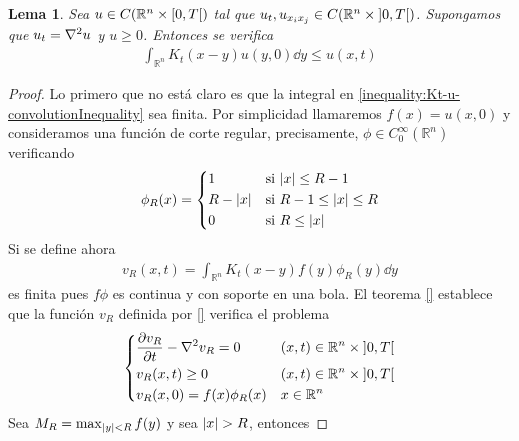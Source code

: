 \documentclass{article}
\newcommand{\realNumbers}{\mathbb{R}}
\newtheorem{lemma}{Lema}
\theoremstyle{definition}
\theoremstyle{remark}
\newcommand{\leftOpenInterval}{\left]}
\newcommand{\rightOpenInterval}{\right[}
\newcommand{\leftClosedInterval}{\left[}
\newcommand{\rightClosedInterval}{\right]}
\newcommand{\interval}[3]{%
  \ifstrequal{#1}{oo}{%
    \leftOpenInterval #2, #3 \rightOpenInterval%
  }{%
    \ifstrequal{#1}{co}{%
      \leftClosedInterval #2, #3 \rightOpenInterval%
    }{%
      \ifstrequal{#1}{oc}{
        \leftOpenInterval #2, #3 \rightClosedInterval%
      }{%
        \ifstrequal{#1}{cc}{
          \leftClosedInterval #2, #3 \rightClosedInterval
        }{%
        }%
      }%
    }%
  }%
}
\begin{document}
  \begin{lemma} %
    Sea \(u \in C(\realNumbers^n \times \interval{co}{0}{T})\) tal que \(u_t, u_{x_i x_j} \in C(\realNumbers^n \times \interval{oo}{0}{T})\).
    Supongamos que \(u_t = \laplacian u\) y \(u \geq 0\).
    Entonces se verifica
    \begin{align}
      \label{inequality:Kt-u-convolutionInequality}
      \int_{\realNumbers^n} K_t(x - y) u(y, 0) \dd y
      \leq
      u(x, t)
    \end{align}
  \end{lemma}
  \begin{proof}
    Lo primero que no está claro es que la integral en \ref{inequality:Kt-u-convolutionInequality} sea finita.
    Por simplicidad llamaremos \(f(x) = u(x, 0)\) y consideramos una función de corte regular, precisamente, \(\phi \in C^{\infty}_0(\realNumbers^n)\) verificando
    \begin{align}
      \phi_R(x)
      =
      \left\{
        \begin{aligned}
          & 1
            && \text{si } \abs{x} \leq R - 1
          \\
          & R - \abs{x}
            && \text{si } R - 1 \leq \abs{x} \leq R
          \\
          & 0
            && \text{si } R \leq \abs{x}
        \end{aligned}
      \right.
    \end{align}
    Si se define ahora
    \begin{align}
      v_R(x, t)
      =
      \int_{\realNumbers^n} K_t(x - y) f(y) \phi_R(y) \dd y
    \end{align}
    es finita pues \(f \phi\) es continua y con soporte en una bola.
    El teorema \ref{}  %
    establece que la función \(v_R\) definida por \ref{}  %
    verifica el problema
    \begin{align}
      \left\{
        \begin{aligned}
          & \frac{\partial v_R}{\partial t} - \laplacian v_R = 0
            && (x, t) \in \realNumbers^n \times \interval{oo}{0}{T}
          \\
          & v_R(x, t) \geq 0
            && (x, t) \in \realNumbers^n \times \interval{oo}{0}{T}
          \\
          & v_R(x, 0) = f(x)\phi_R(x)
            && x \in \realNumbers^n
        \end{aligned}
      \right.
    \end{align}
    Sea \(M_R = \max_{\abs{y} < R} f(y)\) y sea \(\abs{x} > R\), entonces

\end{proof}
\end{document}
